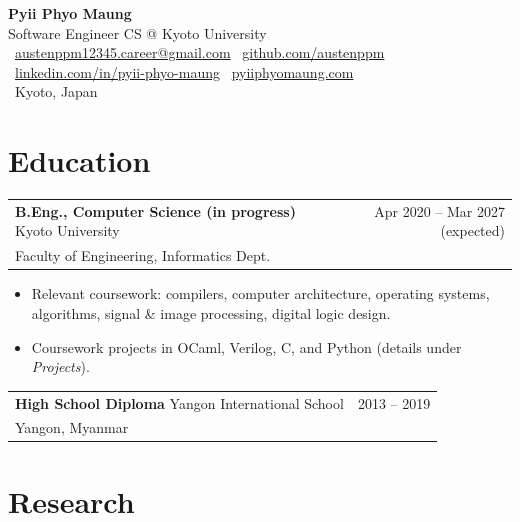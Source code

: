 \documentclass[11pt,a4paper]{article}
\makeatletter
\newcommand{\role}[4]{%
  \noindent
  \begin{tabular*}{\linewidth}{@{\extracolsep{\fill}}l r}
    \textbf{#1} \textcolor{muted}{\textbar{}} #2 & \textcolor{muted}{#3}\\[-1pt]
    \textcolor{muted}{\small #4} &
  \end{tabular*}\par\vspace{-2pt}
}
\newenvironment{bullets}
  {\begin{itemize}[leftmargin=1.1em, itemsep=1pt, parsep=0pt, topsep=2pt]}
  {\end{itemize}}
\makeatother
\begin{document}
\color{fg}

\begin{center}
  {\Huge\bfseries Pyii Phyo Maung}\\[4pt]
  {\color{muted}\large Software Engineer \textperiodcentered{} CS @ Kyoto University}\\[8pt]
  \small
  \faEnvelope[regular]\ \href{mailto:austenppm12345.career@gmail.com}{austenppm12345.career@gmail.com}
  \quad\textcolor{muted}{\textbar}\quad
  \faGithub\ \href{https://github.com/austenppm}{github.com/austenppm}
  \quad\textcolor{muted}{\textbar}\quad
  \faLinkedin\ \href{https://www.linkedin.com/in/pyii-phyo-maung-70435017a/}{linkedin.com/in/pyii-phyo-maung}
  \quad\textcolor{muted}{\textbar}\quad
  \faGlobe\ \href{https://pyiiphyomaung.com}{pyiiphyomaung.com}
  \\[2pt]
  \faMapMarker*\ \textcolor{muted}{Kyoto, Japan}
\end{center}

\vspace{4pt}

\section{Education}

\role
  {B.Eng., Computer Science (in progress)}
  {Kyoto University}
  {Apr 2020 -- Mar 2027 (expected)}
  {Faculty of Engineering, Informatics Dept.}
\begin{bullets}
  \item Relevant coursework: compilers, computer architecture, operating systems, algorithms, signal \& image processing, digital logic design.
  \item Coursework projects in OCaml, Verilog, C, and Python (details under \textit{Projects}).
\end{bullets}

\role
  {High School Diploma}
  {Yangon International School}
  {2013 -- 2019}
  {Yangon, Myanmar}

\section{Research}
\end{document}

